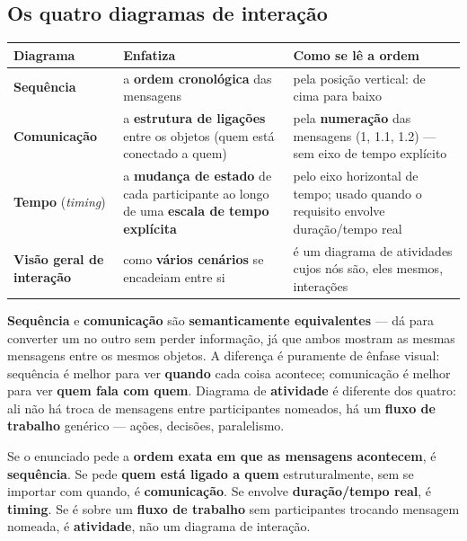 \subsection{Os quatro diagramas de interação}

\begin{conceito}
\begin{center}
\begin{tabular}{@{}p{3.2cm}p{4.2cm}p{4.2cm}@{}}
\toprule
\textbf{Diagrama} & \textbf{Enfatiza} & \textbf{Como se lê a ordem} \\
\midrule
\textbf{Sequência} & a \textbf{ordem cronológica} das mensagens & pela
posição vertical: de cima para baixo \\
\textbf{Comunicação} & a \textbf{estrutura de ligações} entre os objetos
(quem está conectado a quem) & pela \textbf{numeração} das mensagens (1,
1.1, 1.2) --- sem eixo de tempo explícito \\
\textbf{Tempo} (\textit{timing}) & a \textbf{mudança de estado} de cada
participante ao longo de uma \textbf{escala de tempo explícita} & pelo eixo
horizontal de tempo; usado quando o requisito envolve duração/tempo real \\
\textbf{Visão geral de interação} & como \textbf{vários cenários} se
encadeiam entre si & é um diagrama de atividades cujos nós são, eles
mesmos, interações \\
\bottomrule
\end{tabular}
\end{center}

\textbf{Sequência} e \textbf{comunicação} são \textbf{semanticamente
equivalentes} --- dá para converter um no outro sem perder informação, já
que ambos mostram as mesmas mensagens entre os mesmos objetos. A diferença
é puramente de ênfase visual: sequência é melhor para ver \textbf{quando}
cada coisa acontece; comunicação é melhor para ver \textbf{quem fala com
quem}. Diagrama de \textbf{atividade} é diferente dos quatro: ali não há
troca de mensagens entre participantes nomeados, há um \textbf{fluxo de
trabalho} genérico --- ações, decisões, paralelismo.
\end{conceito}

\begin{regrapratica}
Se o enunciado pede a \textbf{ordem exata em que as mensagens acontecem},
é \textbf{sequência}. Se pede \textbf{quem está ligado a quem}
estruturalmente, sem se importar com quando, é \textbf{comunicação}. Se
envolve \textbf{duração/tempo real}, é \textbf{timing}. Se é sobre um
\textbf{fluxo de trabalho} sem participantes trocando mensagem nomeada, é
\textbf{atividade}, não um diagrama de interação.
\end{regrapratica}

